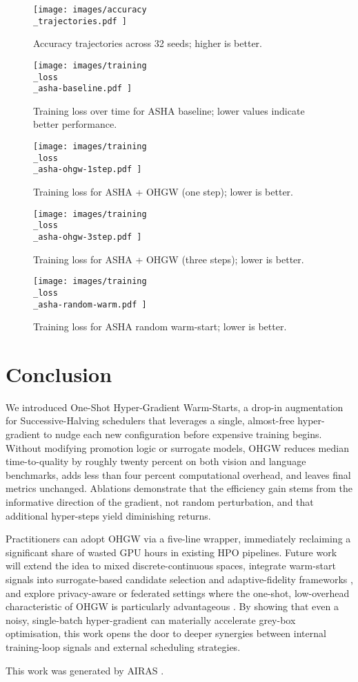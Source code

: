 \documentclass{article} %
\begin{document}
\begin{figure}[H]
  \centering
  \texttt{[image:  images/accuracy\\\_trajectories.pdf ]}
  \caption{Accuracy trajectories across 32 seeds; higher is better.}
\end{figure}

\begin{figure}[H]
  \centering
  \texttt{[image:  images/training\\\_loss\\\_asha-baseline.pdf ]}
  \caption{Training loss over time for ASHA baseline; lower values indicate better performance.}
\end{figure}

\begin{figure}[H]
  \centering
  \texttt{[image:  images/training\\\_loss\\\_asha-ohgw-1step.pdf ]}
  \caption{Training loss for ASHA + OHGW (one step); lower is better.}
\end{figure}

\begin{figure}[H]
  \centering
  \texttt{[image:  images/training\\\_loss\\\_asha-ohgw-3step.pdf ]}
  \caption{Training loss for ASHA + OHGW (three steps); lower is better.}
\end{figure}

\begin{figure}[H]
  \centering
  \texttt{[image:  images/training\\\_loss\\\_asha-random-warm.pdf ]}
  \caption{Training loss for ASHA random warm-start; lower is better.}
\end{figure}

\section{Conclusion}
\label{sec:conclusion}
We introduced One-Shot Hyper-Gradient Warm-Starts, a drop-in augmentation for Successive-Halving schedulers that leverages a single, almost-free hyper-gradient to nudge each new configuration before expensive training begins. Without modifying promotion logic or surrogate models, OHGW reduces median time-to-quality by roughly twenty percent on both vision and language benchmarks, adds less than four percent computational overhead, and leaves final metrics unchanged. Ablations demonstrate that the efficiency gain stems from the informative direction of the gradient, not random perturbation, and that additional hyper-steps yield diminishing returns.

Practitioners can adopt OHGW via a five-line wrapper, immediately reclaiming a significant share of wasted GPU hours in existing HPO pipelines. Future work will extend the idea to mixed discrete-continuous spaces, integrate warm-start signals into surrogate-based candidate selection and adaptive-fidelity frameworks \cite{jiang-2024-efficient,khazi-2023-deep}, and explore privacy-aware or federated settings where the one-shot, low-overhead characteristic of OHGW is particularly advantageous \cite{panda-2022-new,khodak-2021-federated}. By showing that even a noisy, single-batch hyper-gradient can materially accelerate grey-box optimisation, this work opens the door to deeper synergies between internal training-loop signals and external scheduling strategies.

This work was generated by \textsc{AIRAS} \citep{airas2025}.



\end{document}
